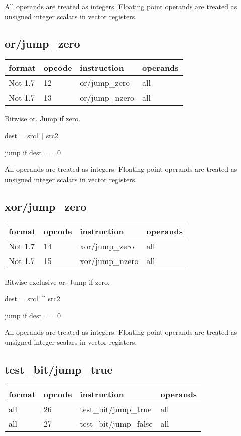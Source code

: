 \documentclass[forwardcom.tex]{subfiles}
\begin{document}
All operands are treated as integers. 
Floating point operands are treated as unsigned integer scalars in vector registers.
\vv

\subsection{or/jump\_zero}
\label{table:orJumpZeroInstruction}
\begin{tabular}{|p{16mm}|p{12mm}|p{60mm}|p{50mm}|}
\hline
\bfseries format & \bfseries opcode & \bfseries instruction & \bfseries operands \\ \hline
Not 1.7 & 12 & or/jump\_zero & all \\ \hline
Not 1.7 & 13 & or/jump\_nzero & all \\ \hline
\end{tabular}
\vv

Bitwise or. Jump if zero.
\vv

dest = src1 $|$ src2

jump if dest == 0
\vv

All operands are treated as integers. 
Floating point operands are treated as unsigned integer scalars in vector registers.
\vv

\subsection{xor/jump\_zero}
\label{table:xorJumpZeroInstruction}
\begin{tabular}{|p{16mm}|p{12mm}|p{60mm}|p{50mm}|}
\hline
\bfseries format & \bfseries opcode & \bfseries instruction & \bfseries operands \\ \hline
Not 1.7 & 14 & xor/jump\_zero & all \\ \hline
Not 1.7 & 15 & xor/jump\_nzero & all \\ \hline
\end{tabular}
\vv

Bitwise exclusive or. Jump if zero.
\vv

dest = src1 \^{ } src2

jump if dest == 0
\vv

All operands are treated as integers. 
Floating point operands are treated as unsigned integer scalars in vector registers.


\subsection{test\_bit/jump\_true}
\label{table:testBitJumpTrueInstruction}
\begin{tabular}{|p{16mm}|p{12mm}|p{60mm}|p{50mm}|}
\hline
\bfseries format & \bfseries opcode & \bfseries instruction & \bfseries operands \\ \hline
all & 26 & test\_bit/jump\_true & all \\ \hline
all & 27 & test\_bit/jump\_false & all \\ \hline
\end{tabular}
\vv
\end{document}
